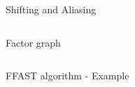 \documentclass[10pt,xcolor=table]{beamer}
\begin{document}
\begin{frame}{Shifting and Aliasing}
\begin{columns}
		\begin{block}{\small Factor graph}
			
			\begin{figure}[t]
				\begin{center}
					\resizebox{1.0\textwidth}{!}{}
					\end{center}
				\end{figure}
		\end{block}
	\end{columns}
\end{frame}
	
	
	\begin{frame}{FFAST algorithm - Example}

\begin{figure}[t]
	\begin{center}
		\resizebox{0.75\textwidth}{!}{}
	\end{center}
\end{figure}
	\vspace*{-4mm}
\begin{figure}[t]
	\begin{center}
		\resizebox{0.52\textwidth}{!}{}
	\end{center}
\end{figure}
	
	\end{frame}
\end{document}
